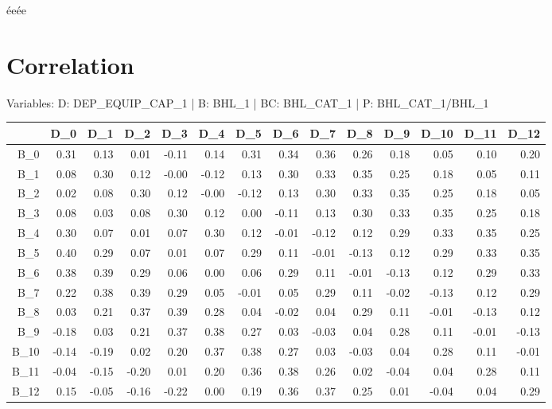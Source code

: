 \documentclass[10pt,a4paper]{article}\usepackage[]{graphicx}\usepackage[]{color}
\newcommand{\AaA}{\_}
\begin{document}
éeée
\tableofcontents
\newpage

\section{Correlation}


Variables: D: DEP\AaA EQUIP\AaA CAP\AaA 1  | B: BHL\AaA 1  | BC: BHL\AaA CAT\AaA 1  | P: BHL\AaA CAT\AaA 1/BHL\AaA 1%
\begin{table}[ht]
\centering
\begin{tabular}{rrrrrrrrrrrrrr}
  \hline
 & D\_0 & D\_1 & D\_2 & D\_3 & D\_4 & D\_5 & D\_6 & D\_7 & D\_8 & D\_9 & D\_10 & D\_11 & D\_12 \\ 
  \hline
B\_0 & 0.31 & 0.13 & 0.01 & -0.11 & 0.14 & 0.31 & 0.34 & 0.36 & 0.26 & 0.18 & 0.05 & 0.10 & 0.20 \\ 
  B\_1 & 0.08 & 0.30 & 0.12 & -0.00 & -0.12 & 0.13 & 0.30 & 0.33 & 0.35 & 0.25 & 0.18 & 0.05 & 0.11 \\ 
  B\_2 & 0.02 & 0.08 & 0.30 & 0.12 & -0.00 & -0.12 & 0.13 & 0.30 & 0.33 & 0.35 & 0.25 & 0.18 & 0.05 \\ 
  B\_3 & 0.08 & 0.03 & 0.08 & 0.30 & 0.12 & 0.00 & -0.11 & 0.13 & 0.30 & 0.33 & 0.35 & 0.25 & 0.18 \\ 
  B\_4 & 0.30 & 0.07 & 0.01 & 0.07 & 0.30 & 0.12 & -0.01 & -0.12 & 0.12 & 0.29 & 0.33 & 0.35 & 0.25 \\ 
  B\_5 & 0.40 & 0.29 & 0.07 & 0.01 & 0.07 & 0.29 & 0.11 & -0.01 & -0.13 & 0.12 & 0.29 & 0.33 & 0.35 \\ 
  B\_6 & 0.38 & 0.39 & 0.29 & 0.06 & 0.00 & 0.06 & 0.29 & 0.11 & -0.01 & -0.13 & 0.12 & 0.29 & 0.33 \\ 
  B\_7 & 0.22 & 0.38 & 0.39 & 0.29 & 0.05 & -0.01 & 0.05 & 0.29 & 0.11 & -0.02 & -0.13 & 0.12 & 0.29 \\ 
  B\_8 & 0.03 & 0.21 & 0.37 & 0.39 & 0.28 & 0.04 & -0.02 & 0.04 & 0.29 & 0.11 & -0.01 & -0.13 & 0.12 \\ 
  B\_9 & -0.18 & 0.03 & 0.21 & 0.37 & 0.38 & 0.27 & 0.03 & -0.03 & 0.04 & 0.28 & 0.11 & -0.01 & -0.13 \\ 
  B\_10 & -0.14 & -0.19 & 0.02 & 0.20 & 0.37 & 0.38 & 0.27 & 0.03 & -0.03 & 0.04 & 0.28 & 0.11 & -0.01 \\ 
  B\_11 & -0.04 & -0.15 & -0.20 & 0.01 & 0.20 & 0.36 & 0.38 & 0.26 & 0.02 & -0.04 & 0.04 & 0.28 & 0.11 \\ 
  B\_12 & 0.15 & -0.05 & -0.16 & -0.22 & 0.00 & 0.19 & 0.36 & 0.37 & 0.25 & 0.01 & -0.04 & 0.04 & 0.29 \\ 
   \hline
\end{tabular}
\end{table}
\end{document}
